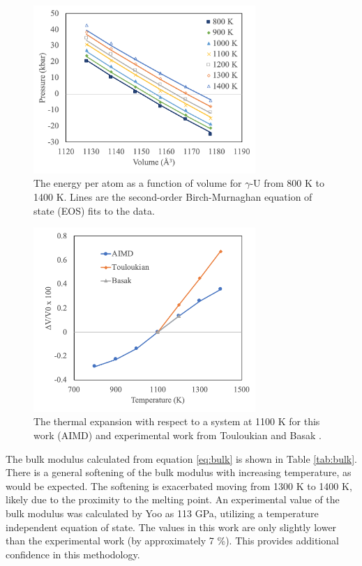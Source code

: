 \documentclass[review]{elsarticle}
\begin{document}
\begin{figure}[h]
 \centering
 \includegraphics[width=0.75\textwidth]{p_vs_v.png} 
 \caption{The energy per atom as a function of volume for $\gamma$-U from 800 K to 1400 K. Lines are the second-order Birch-Murnaghan equation of state (EOS) fits to the data.   }
 \label{fig:pvsv}
\end{figure}

\begin{figure}[h]
 \centering
 \includegraphics[width=0.75\textwidth]{thermal_exp.png} 
 \caption{The thermal expansion with respect to a system at 1100 K for this work (AIMD) and experimental work from Touloukian \cite{touloukian} and Basak \cite{basak} .   }
 \label{fig:exp}
\end{figure}

\FloatBarrier

The bulk modulus calculated from equation \ref{eq:bulk} is shown in Table \ref{tab:bulk}. There is a general softening of the bulk modulus with increasing temperature, as would be expected. The softening is exacerbated moving from 1300 K to 1400 K, likely due to the proximity to the melting point. An experimental value of the bulk modulus was calculated by Yoo \cite{yoo1998} as 113 GPa, utilizing a temperature independent equation of state. The values in this work are only slightly lower than the experimental work (by approximately 7 {\%}). This provides additional confidence in this methodology. 
\end{document}
